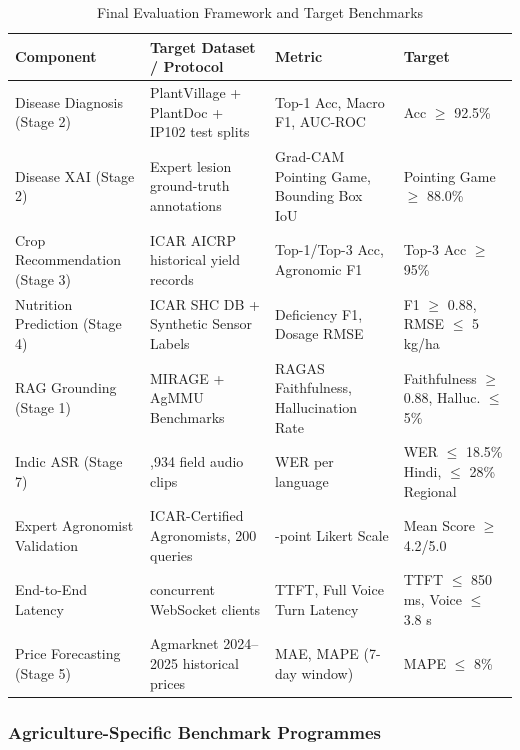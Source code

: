 \documentclass[12pt,a4paper]{article}
\begin{document}
\begin{table}[htbp]
\centering
\small
\setlength{\tabcolsep}{3.5pt}
\renewcommand{\arraystretch}{1.08}
\caption{Final Evaluation Framework and Target Benchmarks}
\label{tab:eval}
\begin{tabularx}{\textwidth}{|>{\raggedright\arraybackslash}p{2.85cm}|>{\raggedright\arraybackslash}X|>{\raggedright\arraybackslash}p{3.4cm}|>{\raggedright\arraybackslash}p{2.6cm}|}
\hline
\textbf{Component} & \textbf{Target Dataset / Protocol} & \textbf{Metric} & \textbf{Target} \\
\hline
Disease Diagnosis (Stage 2) & PlantVillage + PlantDoc + IP102 test splits & Top-1 Acc, Macro F1, AUC-ROC & Acc $\geq$ 92.5\% \\
\hline
Disease XAI (Stage 2) & Expert lesion ground-truth annotations & Grad-CAM Pointing Game, Bounding Box IoU & Pointing Game $\geq$ 88.0\% \\
\hline
Crop Recommendation (Stage 3) & ICAR AICRP historical yield records & Top-1/Top-3 Acc, Agronomic F1 & Top-3 Acc $\geq$ 95\% \\
\hline
Nutrition Prediction (Stage 4) & ICAR SHC DB + Synthetic Sensor Labels & Deficiency F1, Dosage RMSE & F1 $\geq$ 0.88, RMSE $\leq$ 5 kg/ha \\
\hline
RAG Grounding (Stage 1) & MIRAGE + AgMMU Benchmarks & RAGAS Faithfulness, Hallucination Rate & Faithfulness $\geq$ 0.88, Halluc. $\leq$ 5\% \\
\hline
Indic ASR (Stage 7) & 10,934 field audio clips & WER per language & WER $\leq$ 18.5\% Hindi, $\leq$ 28\% Regional \\
\hline
Expert Agronomist Validation & 10 ICAR-Certified Agronomists, 200 queries & 5-point Likert Scale & Mean Score $\geq$ 4.2/5.0 \\
\hline
End-to-End Latency & 100 concurrent WebSocket clients & TTFT, Full Voice Turn Latency & TTFT $\leq$ 850 ms, Voice $\leq$ 3.8 s \\
\hline
Price Forecasting (Stage 5) & Agmarknet 2024--2025 historical prices & MAE, MAPE (7-day window) & MAPE $\leq$ 8\% \\
\hline
\end{tabularx}
\end{table}

\clearpage
\subsubsection{Agriculture-Specific Benchmark Programmes}
\end{document}
